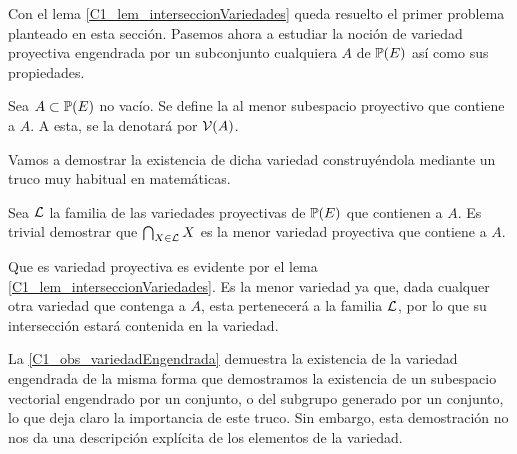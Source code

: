 Con el lema \ref{C1_lem_interseccionVariedades} queda resuelto el primer problema planteado en esta sección. Pasemos ahora a estudiar la noción de variedad proyectiva engendrada por un subconjunto cualquiera $A$ de $\mathbb{P}(E)$ así como sus propiedades.
\begin{defi}
	\label{C1_def_variedadEngendrada}
	Sea $A\subset\mathbb{P}(E)$ no vacío. Se define la  al menor subespacio proyectivo que contiene a $A$. A esta, se la denotará por $\mathcal{V}(A)$.
\end{defi}
Vamos a demostrar la existencia de dicha variedad construyéndola mediante un truco muy habitual en matemáticas.
\begin{obs}
	\label{C1_obs_variedadEngendrada}
	Sea $\mathcal{L}$ la familia de las variedades proyectivas de $\mathbb{P}(E)$ que contienen a $A$. Es trivial demostrar que $\bigcap_{X\in\mathcal{L}}X$ es la menor variedad proyectiva que contiene a $A$.
	
	Que es variedad proyectiva es evidente por el lema \ref{C1_lem_interseccionVariedades}. Es la menor variedad ya que, dada cualquer otra variedad que contenga a $A$, esta pertenecerá a la familia $\mathcal{L}$, por lo que su intersección estará contenida en la variedad.
\end{obs}
La \ref{C1_obs_variedadEngendrada} demuestra la existencia de la variedad engendrada de la misma forma que demostramos la existencia de un subespacio vectorial engendrado por un conjunto, o del subgrupo generado por un conjunto, lo que deja claro la importancia de este truco. Sin embargo, esta demostración no nos da una descripción explícita de los elementos de la variedad.

